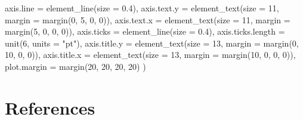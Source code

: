 \documentclass[
  11pt,
]{article}
\newenvironment{Shaded}{\begin{snugshade}}{\end{snugshade}}
\newcommand{\AttributeTok}[1]{\textcolor[rgb]{0.77,0.63,0.00}{#1}}
\newcommand{\DecValTok}[1]{\textcolor[rgb]{0.00,0.00,0.81}{#1}}
\newcommand{\FloatTok}[1]{\textcolor[rgb]{0.00,0.00,0.81}{#1}}
\newcommand{\FunctionTok}[1]{\textcolor[rgb]{0.00,0.00,0.00}{#1}}
\newcommand{\NormalTok}[1]{#1}
\newcommand{\StringTok}[1]{\textcolor[rgb]{0.31,0.60,0.02}{#1}}
\begin{document}
\begin{Shaded}
\begin{Highlighting}[]
    \AttributeTok{axis.line =} \FunctionTok{element\_line}\NormalTok{(}\AttributeTok{size =} \FloatTok{0.4}\NormalTok{),}
    \AttributeTok{axis.text.y =} \FunctionTok{element\_text}\NormalTok{(}\AttributeTok{size =} \DecValTok{11}\NormalTok{, }\AttributeTok{margin =} \FunctionTok{margin}\NormalTok{(}\DecValTok{0}\NormalTok{, }\DecValTok{5}\NormalTok{, }\DecValTok{0}\NormalTok{, }\DecValTok{0}\NormalTok{)),}
    \AttributeTok{axis.text.x =} \FunctionTok{element\_text}\NormalTok{(}\AttributeTok{size =} \DecValTok{11}\NormalTok{, }\AttributeTok{margin =} \FunctionTok{margin}\NormalTok{(}\DecValTok{5}\NormalTok{, }\DecValTok{0}\NormalTok{, }\DecValTok{0}\NormalTok{, }\DecValTok{0}\NormalTok{)),}
    \AttributeTok{axis.ticks =} \FunctionTok{element\_line}\NormalTok{(}\AttributeTok{size =} \FloatTok{0.4}\NormalTok{),}
    \AttributeTok{axis.ticks.length =} \FunctionTok{unit}\NormalTok{(}\DecValTok{6}\NormalTok{, }\AttributeTok{units =} \StringTok{"pt"}\NormalTok{),}
    \AttributeTok{axis.title.y =} \FunctionTok{element\_text}\NormalTok{(}\AttributeTok{size =} \DecValTok{13}\NormalTok{, }\AttributeTok{margin =} \FunctionTok{margin}\NormalTok{(}\DecValTok{0}\NormalTok{, }\DecValTok{10}\NormalTok{, }\DecValTok{0}\NormalTok{, }\DecValTok{0}\NormalTok{)),}
    \AttributeTok{axis.title.x =} \FunctionTok{element\_text}\NormalTok{(}\AttributeTok{size =} \DecValTok{13}\NormalTok{, }\AttributeTok{margin =} \FunctionTok{margin}\NormalTok{(}\DecValTok{10}\NormalTok{, }\DecValTok{0}\NormalTok{, }\DecValTok{0}\NormalTok{, }\DecValTok{0}\NormalTok{)),}
    \AttributeTok{plot.margin =} \FunctionTok{margin}\NormalTok{(}\DecValTok{20}\NormalTok{, }\DecValTok{20}\NormalTok{, }\DecValTok{20}\NormalTok{, }\DecValTok{20}\NormalTok{)}
\NormalTok{  )}
\end{Highlighting}
\end{Shaded}

\newpage

\hypertarget{references}{%
\section*{References}\label{references}}
\end{document}
